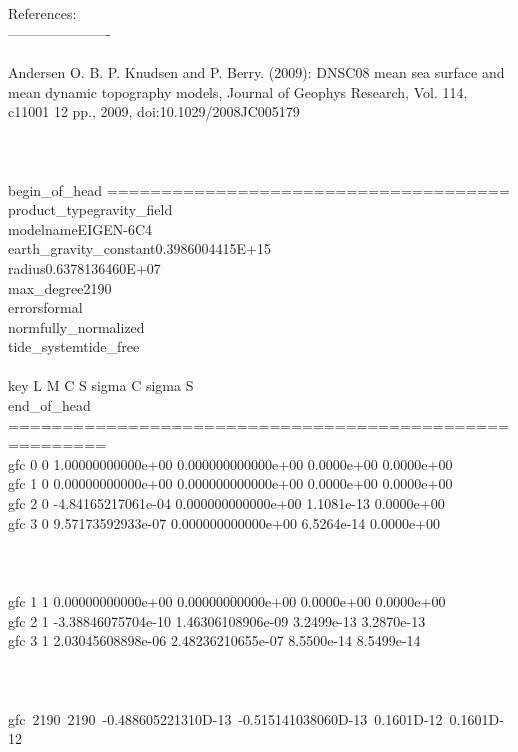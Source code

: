 \documentclass[a4paper, 12pt]{book}
\begin{document}
{\\
\\
\noindent References:\\
\noindent ----------------------
\\
\\
\noindent Andersen O. B. P. Knudsen and P. Berry. (2009): DNSC08 mean sea 
surface and mean dynamic topography models, Journal of Geophys Research, 
Vol. 114, c11001 12 pp., 2009, doi:10.1029/2008JC005179
\\
\\
\noindent [...]
\\
\\
\noindent begin\_of\_head =====================================\\
\noindent product\_type\phantom{***************}gravity\_field\\
\noindent modelname\phantom{******************}EIGEN-6C4\\
\noindent earth\_gravity\_constant\phantom{*****}0.3986004415E+15\\
\noindent radius\phantom{*********************}0.6378136460E+07\\
\noindent max\_degree\phantom{*****************}2190\\
\noindent errors\phantom{*********************}formal\\
\noindent norm\phantom{***********************}fully\_normalized\\
\noindent tide\_system\phantom{****************}tide\_free\\
\\
\noindent key    L    M \phantom{-}C \phantom{-------------------------------}S 
\phantom{----------------------------------}sigma C   \phantom{------}sigma S\\
\noindent end\_of\_head 
=======================================================\\
\noindent gfc    0    0  \phantom{-}1.00000000000e+00 0.000000000000e+00 0.0000e+00 0.0000e+00\\
\noindent gfc    1    0  \phantom{-}0.00000000000e+00 0.000000000000e+00 0.0000e+00 0.0000e+00\\
\noindent gfc    2    0 -4.84165217061e-04 0.000000000000e+00 1.1081e-13 0.0000e+00\\
\noindent gfc    3    0  \phantom{-}9.57173592933e-07 0.000000000000e+00 6.5264e-14 0.0000e+00\\
\\
\noindent [...]
\\
\\
\noindent gfc    1    1 \phantom{-}0.00000000000e+00 0.00000000000e+00 0.0000e+00 0.0000e+00\\
\noindent gfc    2    1 -3.38846075704e-10  1.46306108906e-09 3.2499e-13 3.2870e-13\\
\noindent gfc    3    1 \phantom{-}2.03045608898e-06  2.48236210655e-07 
8.5500e-14 8.5499e-14\\
\\
\noindent [...]
\\
\\
\noindent \mbox{gfc 2190 2190 -0.488605221310D-13 -0.515141038060D-13 0.1601D-12 0.1601D-12}
}
\end{document}
